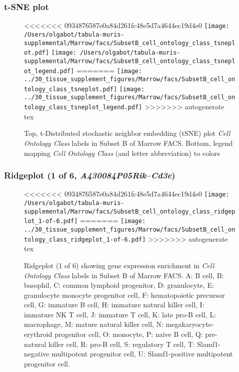 \subsubsection{t-SNE plot}
\begin{figure}[h]
\centering
<<<<<<< 0934876587e0a84d261fc48e5d7a4644ec19d4e0
\texttt{[image: /Users/olgabot/tabula-muris-supplemental/Marrow/facs/SubsetB\_cell\_ontology\_class\_tsneplot.pdf]}
\texttt{[image: /Users/olgabot/tabula-muris-supplemental/Marrow/facs/SubsetB\_cell\_ontology\_class\_tsneplot\_legend.pdf]}
=======
\texttt{[image: ../30\_tissue\_supplement\_figures/Marrow/facs/SubsetB\_cell\_ontology\_class\_tsneplot.pdf]}
\texttt{[image: ../30\_tissue\_supplement\_figures/Marrow/facs/SubsetB\_cell\_ontology\_class\_tsneplot\_legend.pdf]}
>>>>>>> autogenerate tex
\caption{Top, t-Distributed stochastic neighbor embedding (tSNE) plot  \emph{Cell Ontology Class} labels in Subset B of Marrow FACS. Bottom, legend mapping \emph{Cell Ontology Class} (and letter abbreviation) to colors}
\end{figure}


\clearpage

\subsubsection{Ridgeplot (1 of 6, \emph{A430084P05Rik}--\emph{Cd3e})}
\begin{figure}[h]
\centering
<<<<<<< 0934876587e0a84d261fc48e5d7a4644ec19d4e0
\texttt{[image: /Users/olgabot/tabula-muris-supplemental/Marrow/facs/SubsetB\_cell\_ontology\_class\_ridgeplot\_1-of-6.pdf]}
=======
\texttt{[image: ../30\_tissue\_supplement\_figures/Marrow/facs/SubsetB\_cell\_ontology\_class\_ridgeplot\_1-of-6.pdf]}
>>>>>>> autogenerate tex

\caption{ Ridgeplot (1 of 6)  showing gene expression enrichment in \emph{Cell Ontology Class} labels in Subset B of Marrow FACS. A: B cell, B: basophil, C: common lymphoid progenitor, D: granulocyte, E: granulocyte monocyte progenitor cell, F: hematopoietic precursor cell, G: immature B cell, H: immature natural killer cell, I: immature NK T cell, J: immature T cell, K: late pro-B cell, L: macrophage, M: mature natural killer cell, N: megakaryocyte-erythroid progenitor cell, O: monocyte, P: naive B cell, Q: pre-natural killer cell, R: pro-B cell, S: regulatory T cell, T: Slamf1-negative multipotent progenitor cell, U: Slamf1-positive multipotent progenitor cell.}
\end{figure}


